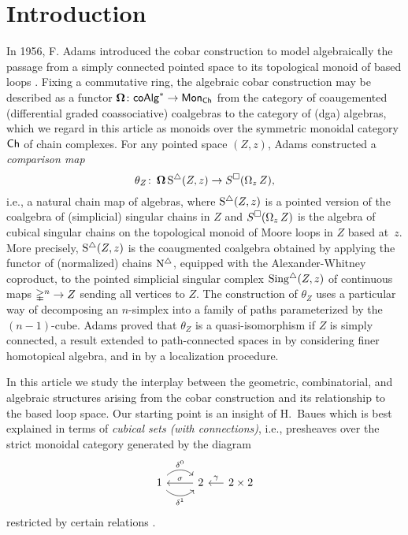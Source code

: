 
\section{Introduction}

In 1956, F. Adams introduced the cobar construction to model algebraically the passage from a simply connected pointed space to its topological monoid of based loops \cite{adams1956cobar}.
Fixing a commutative ring, the algebraic cobar construction may be described as a functor $\operatorname{\mathbf{\Omega}} \colon \mathsf{coAlg}^\ast \to \mathsf{Mon}_{\mathsf{Ch}}$ from the category of coaugemented (differential graded coassociative) coalgebras to the category of (dga) algebras, which we regard in this article as monoids over the symmetric monoidal category $\mathsf{Ch}$ of chain complexes.
For any pointed space $(Z, z)$, Adams constructed a \textit{comparison map}
\begin{equation} \label{e:adams map}
\theta_Z \colon \operatorname{\mathbf{\Omega}} \operatorname{S^{\triangle}}(Z, z) \to S^{\square}(\operatorname{\Omega}_z Z),
\end{equation}
i.e., a natural chain map of algebras, where $\operatorname{S^{\triangle}}(Z,z)$ is a pointed version of the coalgebra of (simplicial) singular chains in $Z$ and $S^{\square}(\operatorname{\Omega}_zZ)$ is the algebra of cubical singular chains on the topological monoid of Moore loops in $Z$ based at~$z$.
More precisely, $\operatorname{S^{\triangle}}(Z,z)$ is the coaugmented coalgebra obtained by applying the functor of (normalized) chains $\operatorname{N^{\triangle}}$, equipped with the Alexander-Whitney coproduct, to the pointed simplicial singular complex $\operatorname{Sing^{\triangle}}(Z, z)$ of continuous maps $\mathbb{\Delta}^n \to Z$ sending all vertices to $Z$.
The construction of $\theta_Z$ uses a particular way of decomposing an $n$-simplex into a family of paths parameterized by the $(n-1)$-cube.
Adams proved that $\theta_Z$ is a quasi-isomorphism if $Z$ is simply connected, a result extended to path-connected spaces in \cite{rivera2018cubical} by considering finer homotopical algebra, and in \cite{hess2010cobar} by a localization procedure.

In this article we study the interplay between the geometric, combinatorial, and algebraic structures arising from the cobar construction and its relationship to the based loop space.
Our starting point is an insight of H.~Baues which is best explained in terms of \textit{cubical sets (with connections)}, i.e., presheaves over the
strict monoidal category generated by the diagram
\[
\begin{tikzcd}
1 \arrow[r, out=45, in=135, "\delta^0"] \arrow[r, out=-45, in=-135, "\delta^1"'] & 2 \arrow[l, "\sigma"'] &[-10pt] \arrow[l, "\gamma"'] 2 \times 2
\end{tikzcd}
\]
restricted by certain relations \cite{brown1981cubes, grandis2003cubical}.

